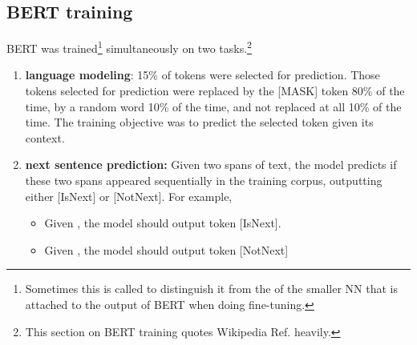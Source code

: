 \subsection{BERT training}
BERT was trained\footnote{Sometimes
this is called 
to distinguish it from
the  of the  smaller NN that is attached to the output of
BERT when doing
fine-tuning.} simultaneously on two tasks.\footnote{This section on BERT training quotes Wikipedia Ref.\cite{wiki-BERT}
heavily.}


\begin{enumerate}
\item {\bf language modeling}: 15\% of tokens were selected for prediction. Those tokens
selected for
prediction
were replaced by the [MASK] token 80\% of the time,
by a random word 10\% of the time,
and not replaced at all 10\% of the time. The training objective was to predict the selected token given its context.

\item{\bf next sentence prediction: }
Given two spans of text, the model predicts if these two spans appeared sequentially in the training corpus, outputting either [IsNext] or [NotNext].
For example,

\begin{itemize}
\item Given , the model
should output token [IsNext].
\item Given , the model
 should output token [NotNext]
\end{itemize}

\end{enumerate}
